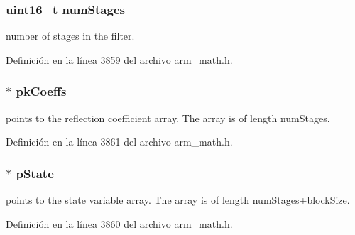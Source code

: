 \subsubsection[{\texorpdfstring{num\+Stages}{numStages}}]{\setlength{\rightskip}{0pt plus 5cm}uint16\+\_\+t num\+Stages}\hypertarget{structarm__iir__lattice__instance__q15_a4cceb90547b3e585d4c7aabaa8057212}{}\label{structarm__iir__lattice__instance__q15_a4cceb90547b3e585d4c7aabaa8057212}
number of stages in the filter. 

Definición en la línea 3859 del archivo arm\+\_\+math.\+h.

\subsubsection[{\texorpdfstring{pk\+Coeffs}{pkCoeffs}}]{$\ast$ pk\+Coeffs}\hypertarget{structarm__iir__lattice__instance__q15_a12497c299b0341c18d497f8ab3465084}{}\label{structarm__iir__lattice__instance__q15_a12497c299b0341c18d497f8ab3465084}
points to the reflection coefficient array. The array is of length num\+Stages. 

Definición en la línea 3861 del archivo arm\+\_\+math.\+h.

\subsubsection[{\texorpdfstring{p\+State}{pState}}]{$\ast$ p\+State}\hypertarget{structarm__iir__lattice__instance__q15_ae29dfdb736374fcddaeaec4b7770170c}{}\label{structarm__iir__lattice__instance__q15_ae29dfdb736374fcddaeaec4b7770170c}
points to the state variable array. The array is of length num\+Stages+block\+Size. 

Definición en la línea 3860 del archivo arm\+\_\+math.\+h.

